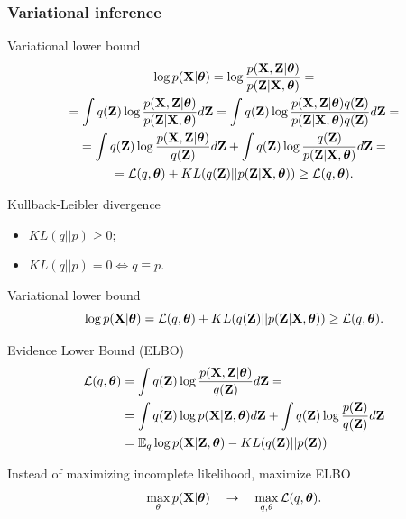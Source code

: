 \subsubsection{Variational inference}
\begin{frame}{Variational lower bound}
	\begin{multline*}
		\log p(\mathbf{X}| \boldsymbol{\theta}) 
		= \log \frac{p(\mathbf{X}, \mathbf{Z}| \boldsymbol{\theta})}{p(\mathbf{Z}|\mathbf{X}, \boldsymbol{\theta})} = \\ 
		= \int q(\mathbf{Z}) \log \frac{p(\mathbf{X}, \mathbf{Z}| \boldsymbol{\theta})}{p(\mathbf{Z}|\mathbf{X}, \boldsymbol{\theta})}d\mathbf{Z}
		= \int q(\mathbf{Z}) \log \frac{p(\mathbf{X}, \mathbf{Z}| \boldsymbol{\theta}) q(\mathbf{Z})}{p(\mathbf{Z}|\mathbf{X}, \boldsymbol{\theta}) q(\mathbf{Z})} d\mathbf{Z} = \\
		= \int q(\mathbf{Z}) \log \frac{p(\mathbf{X}, \mathbf{Z} | \boldsymbol{\theta})}{q(\mathbf{Z})}d\mathbf{Z} + \int q(\mathbf{Z}) \log \frac{q(\mathbf{Z})}{p(\mathbf{Z}|\mathbf{X}, \boldsymbol{\theta})}d\mathbf{Z} = \\ 
		= \mathcal{L} (q, \boldsymbol{\theta}) + KL(q(\mathbf{Z}) || p(\mathbf{Z}|\mathbf{X}, \boldsymbol{\theta})) \geq \mathcal{L} (q, \boldsymbol{\theta}).
	\end{multline*}
	\begin{block}{Kullback-Leibler divergence}
	    \begin{itemize}
	        \item $KL(q || p) \geq 0$;
	        \item $KL(q || p) = 0 \Leftrightarrow q \equiv p$.
	    \end{itemize}
	\end{block}
\end{frame}
\begin{frame}{Variational lower bound}
\[
    \log p(\mathbf{X}| \boldsymbol{\theta}) = \mathcal{L} (q, \boldsymbol{\theta}) + KL(q(\mathbf{Z}) || p(\mathbf{Z}|\mathbf{X}, \boldsymbol{\theta})) \geq \mathcal{L} (q, \boldsymbol{\theta}).
\]
\begin{block}{Evidence Lower Bound (ELBO)}
\begin{align*}
    \mathcal{L} (q, \boldsymbol{\theta}) &= \int q(\mathbf{Z}) \log \frac{p(\mathbf{X}, \mathbf{Z} | \boldsymbol{\theta})}{q(\mathbf{Z})}d\mathbf{Z} = \\ 
    &= \int q(\mathbf{Z}) \log p(\mathbf{X} | \mathbf{Z}, \boldsymbol{\theta}) d\mathbf{Z} + \int q(\mathbf{Z}) \log \frac{p(\mathbf{Z})}{q(\mathbf{Z})}d\mathbf{Z} \\ 
    &= \mathbb{E}_{q} \log p(\mathbf{X} | \mathbf{Z}, \boldsymbol{\theta}) - KL (q(\mathbf{Z}) || p(\mathbf{Z}))
\end{align*}
\end{block}
Instead of maximizing incomplete likelihood, maximize ELBO
\[
    \max_{\theta} p(\mathbf{X} | \boldsymbol{\theta}) \quad \rightarrow \quad \max_{q, \theta} \mathcal{L} (q, \boldsymbol{\theta}).
\]
    
\end{frame}

